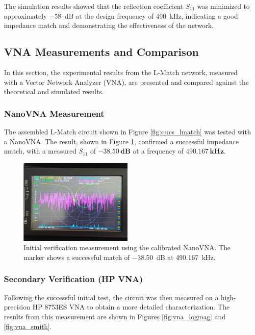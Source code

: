 The simulation results showed that the reflection coefficient \( S_{11} \) was minimized to approximately \SI{-58}{\deci\bel} at the design frequency of \SI{490}{\kilo\hertz}, indicating a good impedance match and demonstrating the effectiveness of the network.

\subsection{VNA Measurements and Comparison}
\label{sec:vna}

In this section, the experimental results from the L-Match network, measured with a Vector Network Analyzer (VNA), are presented and compared against the theoretical and simulated results.

\subsubsection{NanoVNA Measurement}

The assembled L-Match circuit shown in Figure \ref{fig:qucs_lmatch} was tested with a NanoVNA. The result, shown in Figure \ref{fig:nanovna}, confirmed a successful impedance match, with a measured $S_{11}$ of $\mathbf{\SI{-38.50}{\deci\bel}}$ at a frequency of $\mathbf{\SI{490.167}{\kilo\hertz}}$.

\begin{figure}[H]
    \centering
    \includegraphics[width=0.5\textwidth]{Images/nanovna_s11.jpeg}
    \caption{Initial verification measurement using the calibrated NanoVNA. The marker shows a successful match of \SI{-38.50}{\deci\bel} at \SI{490.167}{\kilo\hertz}.}
    \label{fig:nanovna}
\end{figure}

\subsubsection{Secondary Verification (HP VNA)}
Following the successful initial test, the circuit was then measured on a high-precision HP 8753ES VNA to obtain a more detailed characterization. The results from this measurement are shown in Figures \ref{fig:vna_logmag} and \ref{fig:vna_smith}.

